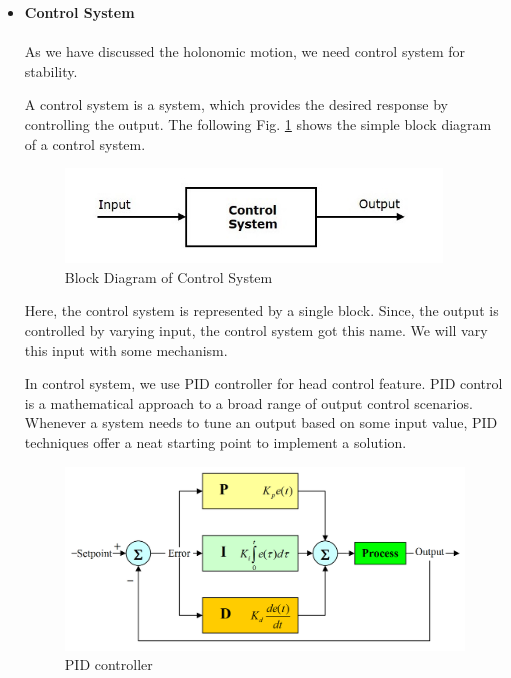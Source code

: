\begin{itemize}[wide, labelwidth=!, labelindent=0pt]
    \newpage
    \item \textbf{Control System}
    \vspace{-0.5cm} 
    \paragraph{} As we have discussed the holonomic motion, we need control system for stability.
    
    A control system is a system, which provides the desired response by controlling the output. The following Fig. \ref{cs} shows the simple block diagram of a control system.
    
    \begin{figure}[H]
    \centering
    \includegraphics[width = 10cm]{project/images/control_system.jpg}
    \caption{Block Diagram of Control System}\label{cs}
    \end{figure}
    
    Here, the control system is represented by a single block. Since, the output is controlled by varying input, the control system got this name. We will vary this input with some mechanism.
    
     In control system, we use PID controller for head control feature. PID control is a mathematical approach to a broad range of output control scenarios. Whenever a system needs to tune an output based on some input value, PID techniques offer a neat starting point to implement a solution.
    
    \begin{figure}[H]
    \centering
    \includegraphics[width = 14cm]{project/images/pid.png}
    \caption{PID controller}
    \end{figure}
    
\end{itemize}


